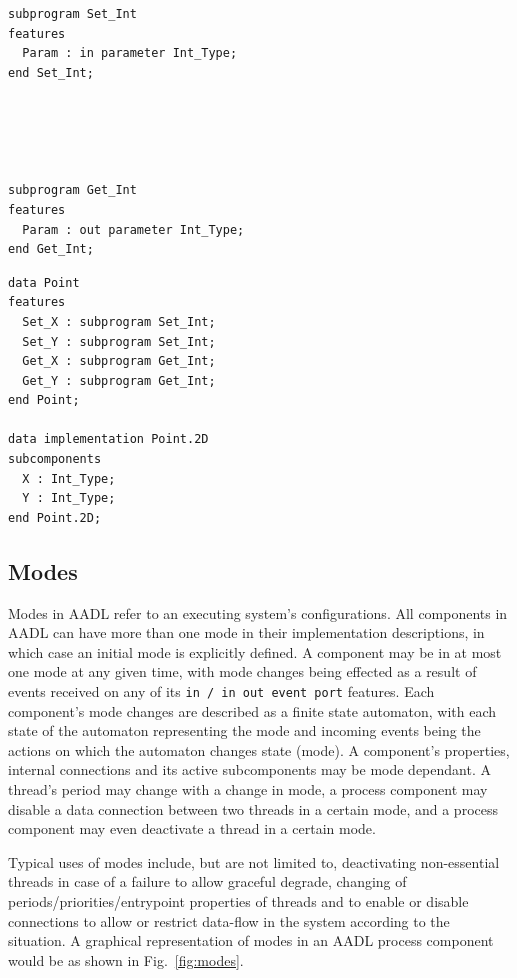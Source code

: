 \begin{minipage}{0.45\linewidth}
\lstset{language=aadl}
\centering
\begin{lstlisting}[label=lst:subprog_features, caption=Subprograms
    for data type declaration]
subprogram Set_Int
features
  Param : in parameter Int_Type;
end Set_Int;





subprogram Get_Int
features
  Param : out parameter Int_Type;
end Get_Int;
\end{lstlisting}
\end{minipage}
\hspace{0.5cm}
\begin{minipage}{0.45\linewidth}
\centering
\begin{lstlisting}[label=lst:data_type_subprog, caption=Data type with
  subprogram features]
data Point
features
  Set_X : subprogram Set_Int;
  Set_Y : subprogram Set_Int;
  Get_X : subprogram Get_Int;
  Get_Y : subprogram Get_Int;
end Point;

data implementation Point.2D
subcomponents
  X : Int_Type;
  Y : Int_Type;
end Point.2D;
\end{lstlisting}
\end{minipage}

\subsection{Modes}
Modes in AADL refer to an executing system's configurations. All
components in AADL can have more than one mode in their implementation
descriptions, in which case an initial mode is explicitly defined. A
component may be in at most one mode at any given time, with mode
changes being effected as a result of events received on any of its
\texttt{in / in out event port} features. Each component's mode
changes are described as a finite state automaton, with each state of
the automaton representing the mode and incoming events being the
actions on which the automaton changes state (mode). A component's
properties, internal connections and its active subcomponents may be
mode dependant. A thread's period may change with a change in mode, a
process component may disable a data connection between two threads in
a certain mode, and a process component may even deactivate a thread
in a certain mode.

Typical uses of modes include, but are not limited to, deactivating
non-essential threads in case of a failure to allow graceful degrade,
changing of periods/priorities/entrypoint properties of threads and to
enable or disable connections to allow or restrict data-flow in the
system according to the situation. A graphical representation of modes
in an AADL process component would be as shown in
Fig.~\ref{fig:modes}.

